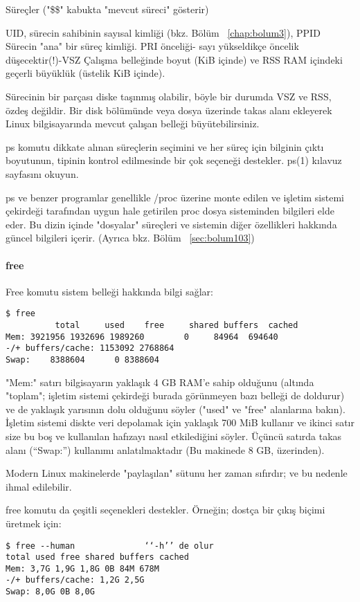 \begin{section}{Süreçler}
("\$\$" kabukta "mevcut süreci" gösterir)

UID, sürecin sahibinin sayısal kimliği (bkz. Bölüm ~\ref{chap:bolum3}), PPID Sürecin "ana" bir süreç kimliği. PRI önceliği- sayı yükseldikçe öncelik düşecektir(!)-VSZ Çalışma belleğinde boyut (KiB içinde) ve RSS RAM içindeki geçerli büyüklük (üstelik KiB içinde).

Sürecinin bir parçası diske taşınmış olabilir, böyle bir durumda VSZ ve RSS, özdeş değildir. Bir disk bölümünde veya dosya üzerinde takas alanı ekleyerek Linux bilgisayarında mevcut çalışan belleği büyütebilirsiniz. 

ps komutu dikkate alınan süreçlerin seçimini ve her süreç için bilginin çıktı boyutunun, tipinin kontrol edilmesinde bir çok seçeneği destekler. ps(1) kılavuz sayfasını okuyun.

ps ve benzer programlar genellikle /proc üzerine monte edilen ve işletim sistemi çekirdeği tarafından uygun hale getirilen proc dosya sisteminden bilgileri elde eder. Bu dizin içinde "dosyalar" süreçleri ve sistemin diğer özellikleri hakkında güncel bilgileri içerir. (Ayrıca bkz. Bölüm ~\ref{sec:bolum103})
\paragraph{free}{Free komutu sistem belleği hakkında bilgi sağlar:
\begin{verbatim}
$ free
          total     used    free     shared buffers  cached
Mem: 3921956 1932696 1989260        0     84964  694640 
-/+ buffers/cache: 1153092 2768864
Swap:    8388604      0 8388604
\end{verbatim}
}

"Mem:" satırı bilgisayarın yaklaşık 4 GB RAM'e sahip olduğunu (altında "toplam"; işletim sistemi çekirdeği burada görünmeyen bazı belleği de doldurur) ve de yaklaşık yarısının dolu olduğunu söyler ("used" ve "free" alanlarına bakın). İşletim sistemi diskte veri depolamak için yaklaşık 700 MiB kullanır ve ikinci satır size bu boş ve kullanılan hafızayı nasıl etkilediğini söyler. Üçüncü satırda takas alanı (“Swap:”) kullanımı anlatılmaktadır (Bu makinede 8 GB, üzerinden).

Modern Linux makinelerde "paylaşılan" sütunu her zaman sıfırdır; ve bu nedenle ihmal edilebilir.

free komutu da çeşitli seçenekleri destekler. Örneğin; dostça bir çıkış biçimi üretmek için:
\begin{verbatim}
$ free --human 				‘‘-h’’ de olur
total used free shared buffers cached
Mem: 3,7G 1,9G 1,8G 0B 84M 678M
-/+ buffers/cache: 1,2G 2,5G
Swap: 8,0G 0B 8,0G
\end{verbatim}


\end{section}
